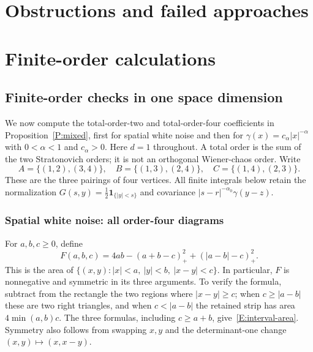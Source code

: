 \documentclass[12pt,oneside,openany]{book}
\numberwithin{equation}{section}
\theoremstyle{nogostyle}
\theoremstyle{definition}
\begin{document}
\chapter{Obstructions and failed approaches}\label{S:book-no-go}
\label{S:appendix-no-go} %



\appendix

\chapter{Finite-order calculations}\label{S:appendix-finite-order}



\section{Finite-order checks in one space dimension}\label{S:G1}

We now compute the total-order-two and total-order-four coefficients in
Proposition~\ref{P:mixed}, first for spatial white noise and then for $\gamma(x)
= c_\alpha|x|^{-\alpha}$ with $0 < \alpha < 1$ and $c_\alpha > 0$. Here $d = 1$
throughout. A total order is the sum of the two Stratonovich orders; it is not
an orthogonal Wiener-chaos order. Write
\[
  A=\{(1,2),(3,4)\},\quad B=\{(1,3),(2,4)\},\quad
  C=\{(1,4),(2,3)\}.
\]
These are the three pairings of four vertices. All finite integrals below retain
the normalization $G(s,y) = \frac12\mathbf1_{\{|y|<s\}}$ and covariance
$|s-r|^{-\alpha_0}\gamma(y-z)$.

\subsection{Spatial white noise: all order-four diagrams}

For $a,b,c \ge 0$, define
\begin{equation}\label{E:interval-area}
  F(a,b,c)=4ab-(a+b-c)_+^2+(|a-b|-c)_+^2.
\end{equation}
This is the area of $\{(x,y):|x|<a,\ |y|<b,\ |x-y|<c\}$. In particular, $F$ is
nonnegative and symmetric in its three arguments. To verify the formula,
subtract from the rectangle the two regions where $|x-y| \ge c$; when $c \ge
|a-b|$ these are two right triangles, and when $c < |a-b|$ the retained strip
has area $4\min(a,b)c$. The three formulas, including $c \ge a+b$,
give~\eqref{E:interval-area}. Symmetry also follows from swapping $x,y$ and the
determinant-one change $(x,y)\mapsto(x,x-y)$.
\end{document}
